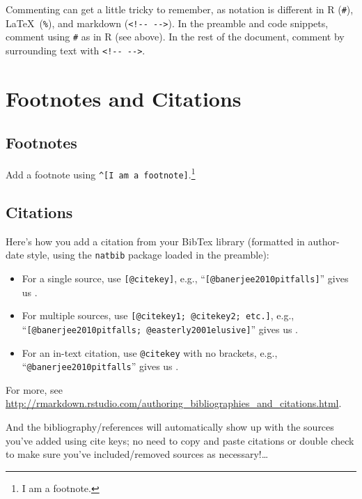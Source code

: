 \documentclass[11pt,]{article}
\providecommand{\tightlist}{%
  \setlength{\itemsep}{0pt}\setlength{\parskip}{0pt}}
\let\rmarkdownfootnote\footnote%
\def\footnote{\protect\rmarkdownfootnote}
\begin{document}
Commenting can get a little tricky to remember, as notation is different
in R (\texttt{\#}), \LaTeX~(\texttt{\%}), and markdown
(\texttt{\textless{}!-\/-\ -\/-\textgreater{}}). In the preamble and
code snippets, comment using \texttt{\#} as in R (see above). In the
rest of the document, comment by surrounding text with
\texttt{\textless{}!-\/-\ -\/-\textgreater{}}.

\hypertarget{footnotes-and-citations}{%
\section{Footnotes and Citations}\label{footnotes-and-citations}}

\hypertarget{footnotes}{%
\subsection{Footnotes}\label{footnotes}}

Add a footnote using \texttt{\^{}{[}I\ am\ a\ footnote{]}}.\footnote{I
  am a footnote.}

\hypertarget{citations}{%
\subsection{Citations}\label{citations}}

Here's how you add a citation from your BibTex library (formatted in
author-date style, using the \texttt{natbib} package loaded in the
preamble):

\begin{itemize}
\tightlist
\item
  For a single source, use \texttt{{[}@citekey{]}}, e.g.,
  ``\texttt{{[}@banerjee2010pitfalls{]}}'' gives us
  \citep{banerjee2010pitfalls}.
\item
  For multiple sources, use \texttt{{[}@citekey1;\ @citekey2;\ etc.{]}},
  e.g., ``\texttt{{[}@banerjee2010pitfalls;\ @easterly2001elusive{]}}''
  gives us \citep{banerjee2010pitfalls, easterly2001elusive}.
\item
  For an in-text citation, use \texttt{@citekey} with no brackets, e.g.,
  ``\texttt{@banerjee2010pitfalls}'' gives us
  \citet{banerjee2010pitfalls}.
\end{itemize}

For more, see
\url{http://rmarkdown.rstudio.com/authoring_bibliographies_and_citations.html}.

And the bibliography/references will automatically show up with the
sources you've added using cite keys; no need to copy and paste
citations or double check to make sure you've included/removed sources
as necessary!\ldots{}


\end{document}
